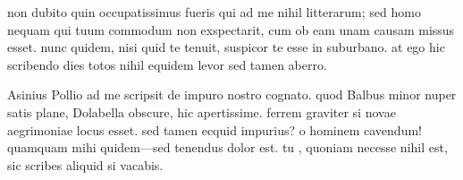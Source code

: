 


 non dubito quin occupatissimus fueris qui ad me nihil litterarum; sed homo nequam qui tuum commodum non exspectarit, cum ob eam unam causam missus esset. nunc quidem, nisi quid te tenuit, suspicor te esse in suburbano. at ego hic scribendo dies totos nihil equidem levor sed tamen aberro.

 Asinius Pollio ad me scripsit de impuro nostro cognato. quod Balbus minor nuper satis plane, Dolabella obscure, hic apertissime. ferrem graviter si novae aegrimoniae locus esset. sed tamen ecquid impurius? o hominem cavendum! quamquam mihi quidem—sed tenendus dolor est. tu , quoniam necesse nihil est, sic scribes aliquid si vacabis.
